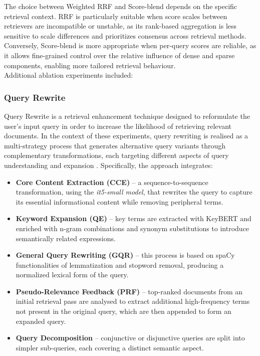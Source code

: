 \begin{spacing}{1.5}
The choice between Weighted RRF and Score-blend depends on the specific retrieval context. RRF is particularly suitable when score scales between retrievers are incompatible or unstable, as its rank-based aggregation is less sensitive to scale differences and prioritizes consensus across retrieval methods. Conversely, Score-blend is more appropriate when per-query scores are reliable, as it allows fine-grained control over the relative influence of dense and sparse components, enabling more tailored retrieval behaviour.\\


\noindent Additional ablation experiments included:\\

\noindent\subsubsection*{\Large Query Rewrite}
Query Rewrite is a retrieval enhancement technique designed to reformulate the user’s input query in order to increase the likelihood of retrieving relevant documents. In the context of these experiments, query rewriting is realised as a multi-strategy process that generates alternative query variants through complementary transformations, each targeting different aspects of query understanding and expansion \citep{li_dmqr-rag_2024}. Specifically, the approach integrates:
\begin{itemize}
      \item \textbf{Core Content Extraction (CCE)} -- a sequence-to-sequence transformation, using the \textit{it5-small model}, that rewrites the query to capture its essential informational content while removing peripheral terms.
      \item \textbf{Keyword Expansion (QE)} -- key terms are extracted with KeyBERT and enriched with n-gram combinations and synonym substitutions to introduce semantically related expressions.
      \item \textbf{General Query Rewriting (GQR)} -- this process is based on spaCy functionalities of lemmatization and stopword removal, producing a normalized lexical form of the query.
      \item \textbf{Pseudo-Relevance Feedback (PRF)} -- top-ranked documents from an initial retrieval pass are analysed to extract additional high-frequency terms not present in the original query, which are then appended to form an expanded query.
      \item \textbf{Query Decomposition} -- conjunctive or disjunctive queries are split into simpler sub-queries, each covering a distinct semantic aspect.
\end{itemize}


\end{spacing}
